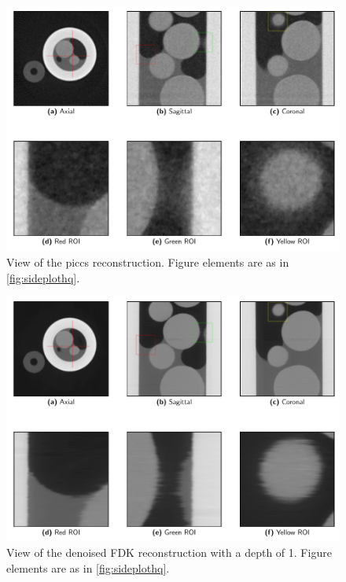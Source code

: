 \begin{figure}[htbp]
  \centering
  \includegraphics[width=.9\textwidth]{figures/kimrobertpiccs-x475y620s250.pdf}
  \caption[PICCS]{View of the \acrshort{piccs} reconstruction. Figure elements are as in \cref{fig:sideplothq}. }
  \label{fig:sideplotpiccs}
\end{figure}

\begin{figure}[htbp]
  \centering
  \includegraphics[width=.9\textwidth]{figures/kimrobertdepth1-x475y620s250.pdf}
  \caption[Depth=1]{View of the denoised FDK reconstruction with a depth of 1. Figure elements are as in \cref{fig:sideplothq}. }
  \label{fig:sideplotdepth1}
\end{figure}

